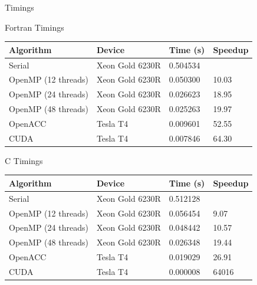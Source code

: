\documentclass[10pt,t]{beamer}
\begin{document}
\begin{frame}[allowframebreaks]{Timings}
  \begin{exampleblock}{Fortran Timings}
    {\scriptsize
    \begin{center}
      \begin{tabular}{|bbbb|}
        \hline
        \rowcolor{lublue}Algorithm & Device & Time (s) & Speedup \\
        \hline
         Serial & Xeon Gold 6230R & 0.504534 & \\
         \hline
         OpenMP (12 threads) & Xeon Gold 6230R & 0.050300 & 10.03 \\
         OpenMP (24 threads) & Xeon Gold 6230R & 0.026623 & 18.95 \\
         OpenMP (48 threads) & Xeon Gold 6230R & 0.025263 & 19.97 \\
         \hline
         OpenACC & Tesla T4 & 0.009601 & 52.55 \\
         \hline
         CUDA & Tesla T4 & 0.007846 & 64.30 \\
        \hline
      \end{tabular}
    \end{center}
    }
  \end{exampleblock}
  \begin{exampleblock}{C Timings}
    {\scriptsize
    \begin{center}
      \begin{tabular}{|bbbb|}
        \hline
        \rowcolor{lublue}Algorithm & Device & Time (s) & Speedup \\
        \hline
         Serial & Xeon Gold 6230R & 0.512128 & \\
         \hline
         OpenMP (12 threads) & Xeon Gold 6230R & 0.056454 &  9.07 \\
         OpenMP (24 threads) & Xeon Gold 6230R & 0.048442 & 10.57 \\
         OpenMP (48 threads) & Xeon Gold 6230R & 0.026348 & 19.44 \\
         \hline
         OpenACC & Tesla T4 & 0.019029 & 26.91 \\
         \hline
         CUDA & Tesla T4 & 0.000008 & 64016 \\
        \hline
      \end{tabular}
    \end{center}
    }
  \end{exampleblock}
 \end{frame}
\end{document}
